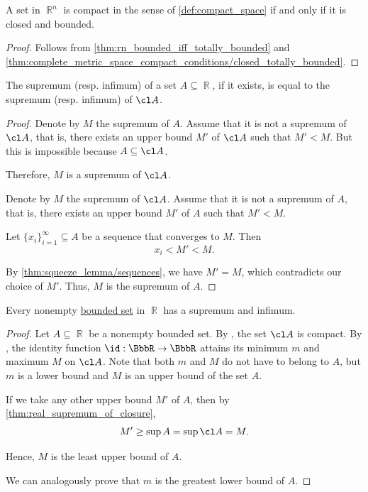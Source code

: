 \begin{theorem}\label{thm:heine_borel}
  A set in \( \BbbR^n \) is compact in the sense of \cref{def:compact_space} if and only if it is closed and bounded.
\end{theorem}
\begin{proof}
  Follows from \cref{thm:rn_bounded_iff_totally_bounded} and \cref{thm:complete_metric_space_compact_conditions/closed_totally_bounded}.
\end{proof}

\begin{proposition}\label{thm:real_supremum_of_closure}
  The supremum (resp. infimum) of a set \( A \subseteq \BbbR \), if it exists, is equal to the supremum (resp. infimum) of \( \cl A \).
\end{proposition}
\begin{proof}
  \SufficiencySubProof Denote by \( M \) the supremum of \( A \). Assume that it is not a supremum of \( \cl A \), that is, there exists an upper bound \( M' \) of \( \cl A \) such that \( M' < M \). But this is impossible because \( A \subseteq \cl A \).

  Therefore, \( M \) is a supremum of \( \cl A \).

  \NecessitySubProof Denote by \( M \) the supremum of \( \cl A \). Assume that it is not a supremum of \( A \), that is, there exists an upper bound \( M' \) of \( A \) such that \( M' < M \).

  Let \( \{ x_i \}_{i=1}^\infty \subseteq A \) be a sequence that converges to \( M \). Then
  \begin{equation*}
    x_i < M' < M.
  \end{equation*}

  By \cref{thm:squeeze_lemma/sequences}, we have \( M' = M \), which contradicts our choice of \( M' \). Thus, \( M \) is the supremum of \( A \).
\end{proof}

\begin{proposition}\label{thm:real_bounded_set_has_supremum}
  Every nonempty \hyperref[def:metric_space/bounded_set]{bounded set} in \( \BbbR \) has a supremum and infimum.
\end{proposition}
\begin{proof}
  Let \( A \subseteq \BbbR \) be a nonempty bounded set. By , the set \( \cl A \) is compact. By , the identity function \( \id: \BbbR \to \BbbR \) attains its minimum \( m \) and maximum \( M \) on \( \cl A \). Note that both \( m \) and \( M \) do not have to belong to \( A \), but \( m \) is a lower bound and \( M \) is an upper bound of the set \( A \).

  If we take any other upper bound \( M' \) of \( A \), then by \cref{thm:real_supremum_of_closure},
  \begin{equation*}
    M' \geq \sup A = \sup \cl A = M.
  \end{equation*}

  Hence, \( M \) is the least upper bound of \( A \).

  We can analogously prove that \( m \) is the greatest lower bound of \( A \).
\end{proof}
